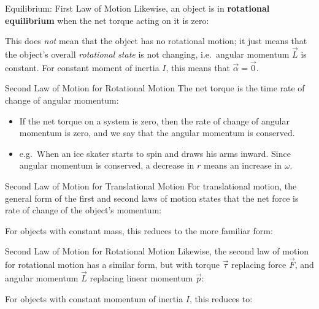 \documentclass[12pt,compress,aspectratio=169]{beamer}
\begin{document}
\begin{frame}{Equilibrium: First Law of Motion}
  Likewise, an object is in \textbf{rotational equilibrium} when the net torque
  acting on it is zero:

  
  This does \emph{not} mean that the object has no rotational motion; it just
  means that the object's overall \emph{rotational state} is not changing,
  i.e.\  angular momentum $\vec L$ is constant. For constant moment of inertia
  $I$, this means that $\vec\alpha=\vec 0$.
\end{frame}



\begin{frame}{Second Law of Motion for Rotational Motion}
  The net torque is the time rate of change of angular momentum:

  \begin{itemize}
  \item If the net torque on a system is zero, then the rate of change
    of angular momentum is zero, and we say that the angular momentum is
    conserved. 
  \item e.g.\ When an ice skater starts to spin and draws his arms inward.
    Since angular momentum is conserved, a decrease in $r$ means an
    increase in $\omega$.
  \end{itemize}
\end{frame}



\begin{frame}{Second Law of Motion for Translational Motion}
  For translational motion, the general form of the first and second laws of
  motion states that the net force is rate of change of the object's momentum:


  For objects with constant mass, this reduces to the more familiar form:

\end{frame}



\begin{frame}{Second Law of Motion for Rotational Motion}
  Likewise, the second law of motion for rotational motion has a similar form,
  but with torque $\vec\tau$ replacing force $\vec F$, and angular momentum
  $\vec L$ replacing linear momentum $\vec p$:


  For objects with constant momentum of inertia $I$, this reduces to:

\end{frame}
\end{document}
